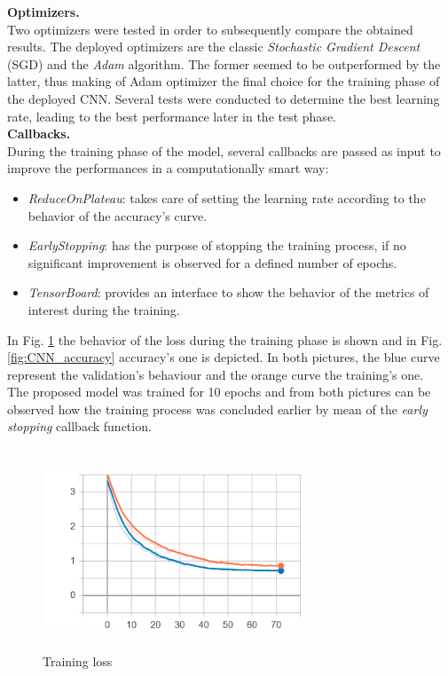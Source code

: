 \noindent \textbf{Optimizers.}\\ Two optimizers were tested in order to subsequently compare the obtained results. The deployed optimizers are the classic {\it{Stochastic Gradient Descent}} (SGD) and the {\it{Adam}} algorithm. The former seemed to be outperformed by the latter, thus making of Adam optimizer the final choice for the training phase of the deployed CNN. Several tests were conducted to determine the best learning rate, leading to the best performance later in the test phase. \\

\noindent \textbf{Callbacks.}\\ During the training phase of the model, several callbacks are passed as input to improve the performances in a computationally smart way:
\begin{itemize}
\item {\it{ReduceOnPlateau}}: takes care of setting the learning rate according to the behavior of the accuracy's curve.
\item {\it{EarlyStopping}}: has the purpose of stopping the training process, if no significant improvement is observed for a defined number of epochs.
\item {\it{TensorBoard}}: provides an interface to show the behavior of the metrics of interest during the training.\\
\end{itemize}

\noindent In Fig. \ref{fig:CNN_loss} the behavior of the loss during the training phase is shown and in Fig.  \ref{fig:CNN_accuracy} accuracy's one is depicted. In both pictures, the blue curve represent the validation's behaviour and the orange curve the training's one.\\The proposed model was trained for 10 epochs and from both pictures can be observed how the training process was concluded earlier by mean of the {\it{early stopping}} callback function.

\begin{figure}[h]
			\centering
	    	\includegraphics[width=8cm, height=6cm]{debug_tuy_loss}
	    	\caption{Training loss}
	    	\label{fig:CNN_loss}
\end{figure} 

